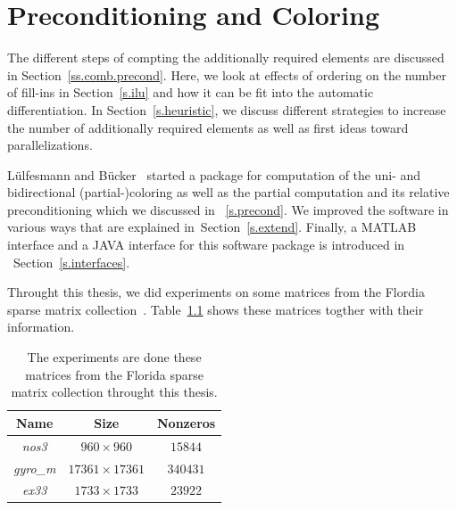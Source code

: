 \documentclass[12pt, oneside]{book}
\newcommand{\secref}[1]{Section~\protect\ref{#1}}
\begin{document}
\chapter{Preconditioning and Coloring}
\label{package}
The different steps of compting the additionally required elements are discussed in
\secref{ss.comb.precond}. Here, we look at effects of ordering on the number of fill-ins
in \secref{s.ilu} and how it can be fit into the automatic differentiation. 
In \secref{s.heuristic}, we discuss different strategies to increase the number of
additionally required elements as well as first ideas toward parallelizations.

Lülfesmann and Bücker~\cite{Lulfesmann2012Fap} started a package for computation of the uni- 
and bidirectional (partial-)coloring as well as the partial computation and its relative preconditioning 
which we discussed in ~\ref{s.precond}. 
We improved the software in various ways that are explained in~\secref{s.extend}.
Finally, a MATLAB interface and a JAVA interface for this software package is introduced 
in ~\secref{s.interfaces}.

Throught this thesis, we did experiments on some matrices from the Flordia sparse
matrix collection~\cite{florida.matrices}. Table~\ref{florida.mats} shows these matrices
togther with their information. 

\begin{table}
\centering
\begin{tabular}{|c|c|c|}
\hline
Name & Size & Nonzeros\\\hline
\textit{nos3} & $960\times 960$ & $15844$\\\hline
\textit{gyro\_m} & $17361\times 17361$ & $340431$ \\\hline
\textit{ex33} & $1733\times 1733$ & $23922$\\\hline
\end{tabular}
\hfill
\caption{The experiments are done these matrices from the Florida sparse matrix collection 
throught this thesis.}
\label{florida.mats}
\end{table}
\end{document}
